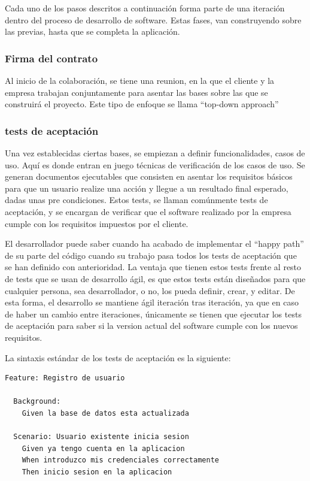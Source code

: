 \documentclass[12pt]{report} %
\begin{document}
Cada uno de los pasos descritos a continuación forma parte de una iteración dentro del proceso de desarrollo de software.
Estas fases, van construyendo sobre las previas, hasta que se completa la aplicación.

\subsubsection{Firma del contrato}

Al inicio de la colaboración, se tiene una reunion, en la que el cliente y la empresa trabajan conjuntamente para asentar las bases sobre las que se construirá el proyecto.
Este tipo de enfoque se llama ``top-down approach'' %

\subsubsection{tests de aceptación}

Una vez establecidas ciertas bases, se empiezan a definir funcionalidades, casos de uso.
Aquí es donde entran en juego técnicas de verificación de los casos de uso.
Se generan documentos ejecutables que consisten en asentar los requisitos básicos para que un usuario realize una acción y llegue a un resultado final esperado, dadas unas pre condiciones.
Estos tests, se llaman comúnmente tests de aceptación, y se encargan de verificar que el software realizado por la empresa cumple con los requisitos impuestos por el cliente.

El desarrollador puede saber cuando ha acabado de implementar el ``happy path'' de su parte del código cuando su trabajo pasa todos los tests de aceptación que se han definido con anterioridad.
La ventaja que tienen estos tests frente al resto de tests que se usan de desarrollo ágil, es que estos tests están diseñados para que cualquier persona, sea desarrollador, o no, los pueda definir, crear, y editar.
De esta forma, el desarrollo se mantiene ágil iteración tras iteración, ya que en caso de haber un cambio entre iteraciones, únicamente se tienen que ejecutar los tests de aceptación para saber si la version actual del software cumple con los nuevos requisitos.

La sintaxis estándar de los tests de aceptación es la siguiente:

\begin{lstlisting}
Feature: Registro de usuario

  Background:
    Given la base de datos esta actualizada

  Scenario: Usuario existente inicia sesion
    Given ya tengo cuenta en la aplicacion
    When introduzco mis credenciales correctamente
    Then inicio sesion en la aplicacion
\end{lstlisting}
\end{document}
